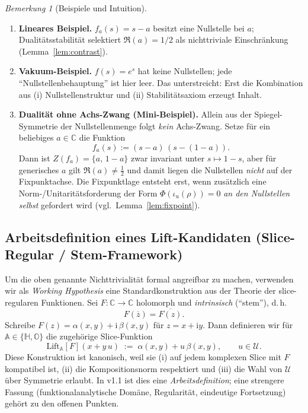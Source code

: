 \documentclass[11pt,a4paper]{article}
\theoremstyle{plain}
\theoremstyle{definition}
\theoremstyle{remark}
\newtheorem{bemerkung}{Bemerkung}
\newcommand{\C}{\mathbb{C}}
\newcommand{\Hh}{\mathbb{H}}
\newcommand{\Okt}{\mathbb{O}}
\newcommand{\ii}{\mathrm{i}}
\begin{document}
\begin{bemerkung}[Beispiele und Intuition]\label{rem:examples}
\begin{enumerate}
\item \textbf{Lineares Beispiel.} $f_a(s)=s-a$ besitzt eine Nullstelle bei $a$; Dualitätsstabilität
      selektiert $\Re(a)=1/2$ als nichttriviale Einschränkung (Lemma~\ref{lem:contrast}).
\item \textbf{Vakuum-Beispiel.} $f(s)=e^s$ hat keine Nullstellen; jede ``Nullstellenbehauptung'' ist hier
      leer. Das unterstreicht: Erst die Kombination aus (i) Nullstellenstruktur und (ii) Stabilitätsaxiom
      erzeugt Inhalt.
\item \textbf{Dualität ohne Achs-Zwang (Mini-Beispiel).} 
      Allein aus der Spiegel-Symmetrie der Nullstellenmenge folgt \emph{kein} Achs-Zwang.
      Setze f\"ur ein beliebiges $a\in\C$ die Funktion
      \[
      f_a(s):=(s-a)\,(s-(1-a)).
      \]
      Dann ist $Z(f_a)=\{a,\,1-a\}$ zwar invariant unter $s\mapsto 1-s$, aber f\"ur generisches $a$ gilt
      $\Re(a)\neq\tfrac12$ und damit liegen die Nullstellen \emph{nicht} auf der Fixpunktachse.
      Die Fixpunktlage entsteht erst, wenn zus\"atzlich eine Norm-/Unitaritätsforderung der Form
      $\Phi(\iota_u(\rho))=0$ \emph{an den Nullstellen selbst} gefordert wird (vgl.\ Lemma~\ref{lem:fixpoint}). 

\end{enumerate}
\end{bemerkung}

\subsection*{Arbeitsdefinition eines Lift-Kandidaten (Slice-Regular / Stem-Framework)}
Um die oben genannte Nichttrivialität formal angreifbar zu machen, verwenden wir als \emph{Working Hypothesis}
eine Standardkonstruktion aus der Theorie der slice-regularen Funktionen.
Sei $F:\C\to\C$ holomorph und \emph{intrinsisch} (``stem''), d.\,h.
\[
F(\overline{z})=\overline{F(z)}.
\]
Schreibe $F(z)=\alpha(x,y)+\ii\,\beta(x,y)$ für $z=x+\ii y$.
Dann definieren wir für $\mathbb A\in\{\Hh,\Okt\}$ die zugehörige Slice-Funktion
\[
\mathrm{Lift}_{\mathbb A}[F](x+y\,u)\;:=\;\alpha(x,y)+u\,\beta(x,y),\qquad u\in\mathcal U.
\]
Diese Konstruktion ist kanonisch, weil sie (i) auf jedem komplexen Slice mit $F$ kompatibel ist,
(ii) die Kompositionsnorm respektiert und (iii) die Wahl von $\mathcal U$ über Symmetrie erlaubt.
In v1.1 ist dies eine \emph{Arbeitsdefinition}; eine strengere Fassung (funktionalanalytische Domäne,
Regularität, eindeutige Fortsetzung) gehört zu den offenen Punkten.
\end{document}
